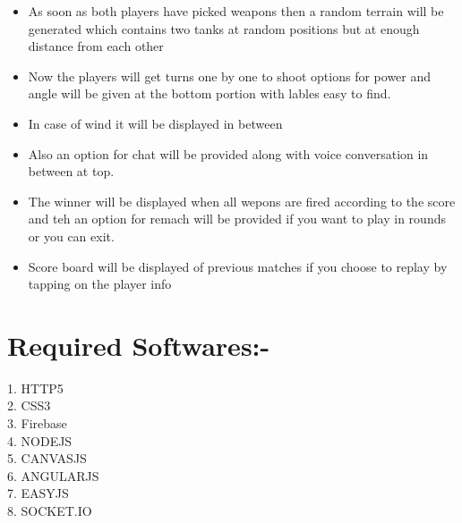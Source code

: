 \documentclass[12pt]{article}
\begin{document}
\begin{itemize}
\item As soon as both players have picked weapons then a random terrain will be generated which contains two tanks at random positions but at enough distance from each other 
\item Now the players will get turns one by one to shoot options for power and angle will be given at the bottom portion with lables easy to find.
\item In case of wind it will be displayed in between 
\item Also an option for chat will be provided along with voice conversation in between at top.
\item The winner will be displayed when all wepons are fired according to the score and teh an option for remach will be provided if you want to play in rounds or you can exit.
\item Score board will be displayed of previous matches if you choose to replay by tapping on the player info  
\end{itemize}
\section{Required Softwares:-}
1. HTTP5\\
2. CSS3\\
3. Firebase\\
4. NODEJS\\
5. CANVASJS\\
6. ANGULARJS\\
7. EASYJS\\
8. SOCKET.IO\\
\end{document}
